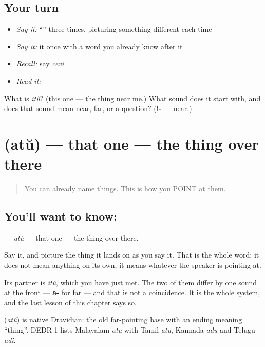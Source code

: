 \subsection*{Your turn}
\begin{itemize}
\raggedright
  \item \emph{Say it:} \textquotedblleft{}\textquotedblright{} three times, picturing something different each time
  \item \emph{Say it:} it once with a word you already know after it
  \item \emph{Recall:} say \emph{cevi}
  \item \emph{Read it:} \textbf{}
\end{itemize}

\begin{tcolorbox}[breakable,colback=teal!4,colframe=teal!35!black,title={Before you move on}]
What is \emph{itŭ}? (this one — the thing near me.) What sound does it start with, and does that sound mean near, far, or a question? (\textbf{i-} — near.)
\end{tcolorbox}
\section[\texorpdfstring{\ml{അത്} (atŭ)}{അത് (atŭ)}]{ (atŭ) — that one — the thing over there}

\label{lesson:ML-C41-that}



\begin{quote}
You can already name things. This is how you POINT at them.
\end{quote}

\subsection*{You'll want to know: }
\textbf{} — \emph{atŭ} — that one — the thing over there.

Say it, and picture the thing it lands on as you say it. That is the whole word: it does not mean anything on its own, it means whatever the speaker is pointing at.

Its partner is \textbf{} \emph{itŭ}, which you have just met. The two of them differ by one sound at the front — \textbf{a-} for far — and that is not a coincidence. It is the whole system, and the last lesson of this chapter says so.

\begin{cousinweb}
\textbf{} (\emph{atŭ}) is native Dravidian: the old far-pointing base with an ending meaning \textquotedblleft{}thing\textquotedblright{}. DEDR 1 lists Malayalam \emph{atu} with Tamil \emph{atu}, Kannada \emph{adu} and Telugu \emph{adi}.
\end{cousinweb}

